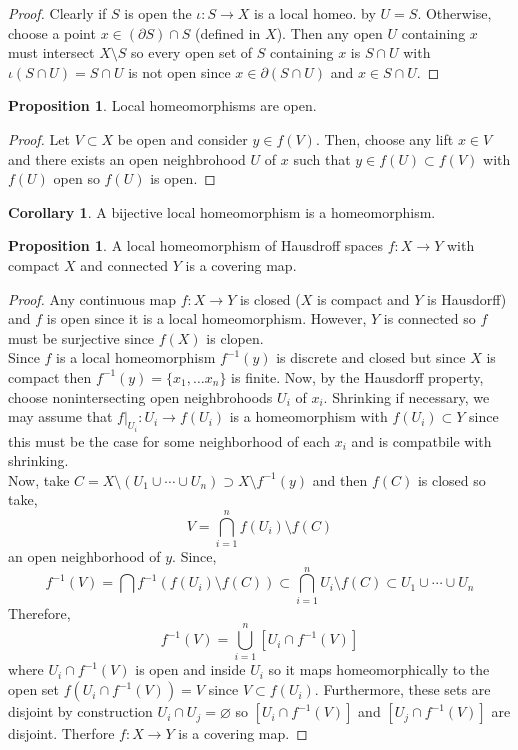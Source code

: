 \documentclass[12pt]{extarticle}
\theoremstyle{definition}
\newtheorem{proposition}[theorem]{Proposition}
\newtheorem{corollary}[theorem]{Corollary}
\begin{document}
\begin{proof}
Clearly if $S$ is open the $\iota : S \to X$ is a local homeo. by $U = S$. Otherwise, choose a point $x \in (\partial S) \cap S$ (defined in $X$). Then any open $U$ containing $x$ must intersect $X \setminus S$ so every open set of $S$ containing $x$ is $S \cap U$ with $\iota(S \cap U) = S \cap U$ is not open since $x \in \partial(S \cap U)$ and $x \in S \cap U$. 
\end{proof}

\begin{proposition}
Local homeomorphisms are open.
\end{proposition}

\begin{proof}
Let $V \subset X$ be open and consider $y \in f(V)$. Then, choose any lift $x \in V$ and there exists an open neighbrohood $U$ of $x$ such that $y \in f(U) \subset f(V)$ with $f(U)$ open so $f(U)$ is open.  
\end{proof}

\begin{corollary}
A bijective local homeomorphism is a homeomorphism.
\end{corollary}

\begin{proposition}
A local homeomorphism of Hausdroff spaces $f : X \to Y$ with compact $X$ and connected $Y$ is a covering map.
\end{proposition}

\begin{proof}
Any continuous map $f : X \to Y$ is closed ($X$ is compact and $Y$ is Hausdorff) and $f$ is open since it is a local homeomorphism. However, $Y$ is connected so $f$ must be surjective since $f(X)$ is clopen. 
\bigskip\\
Since $f$ is a local homeomorphism $f^{-1}(y)$ is discrete and closed but since $X$ is compact then $f^{-1}(y) = \{ x_1, \dots x_n \}$ is finite. Now, by the Hausdorff property, choose nonintersecting open neighbrohoods $U_i$ of $x_i$. Shrinking if necessary, we may assume that $f|_{U_i} : U_i \to f(U_i)$ is a homeomorphism with $f(U_i) \subset Y$ since this must be the case for some neighborhood of each $x_i$ and is compatbile with shrinking.  
\bigskip\\
Now, take $C = X \setminus (U_1 \cup \cdots \cup U_n) \supset X \setminus f^{-1}(y)$ and then $f(C)$ is closed so take,
\[ V = \bigcap_{i = 1}^n f(U_i) \setminus f(C) \]
an open neighborhood of $y$. Since,
\[ f^{-1}(V) = \bigcap f^{-1}(f(U_i) \setminus f(C)) \subset \bigcap_{i = 1}^n U_i \setminus f(C) \subset U_1 \cup \cdots \cup U_n \]
Therefore,
\[ f^{-1}(V) = \bigcup_{i = 1}^n [U_i \cap f^{-1}(V)] \]
where $U_i \cap f^{-1}(V)$ is open and inside $U_i$ so it maps homeomorphically to the open set $f(U_i \cap f^{-1}(V)) = V$ since $V \subset f(U_i)$. Furthermore, these sets are disjoint by construction $U_i \cap U_j = \varnothing$ so $[U_i \cap f^{-1}(V)]$ and $[U_j \cap f^{-1}(V)]$ are disjoint. Therfore $f : X \to Y$ is a covering map.
\end{proof}
\end{document}

